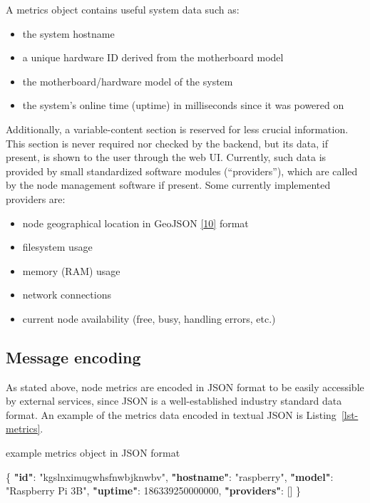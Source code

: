 \documentclass[
  letterpaper,
  a4paper,
  12pt,
  titlepage,
  oneside,
  openany]{book}
\newenvironment{Shaded}{\begin{snugshade}}{\end{snugshade}}
\newcommand{\DataTypeTok}[1]{\textcolor[rgb]{0.00,0.00,0.00}{\textbf{#1}}}
\newcommand{\DecValTok}[1]{\textcolor[rgb]{0.00,0.00,0.00}{#1}}
\newcommand{\FunctionTok}[1]{\textcolor[rgb]{0.00,0.00,0.00}{#1}}
\newcommand{\OtherTok}[1]{\textcolor[rgb]{0.00,0.00,0.00}{#1}}
\newcommand{\StringTok}[1]{\textcolor[rgb]{0.00,0.00,0.00}{#1}}
\providecommand{\tightlist}{%
  \setlength{\itemsep}{0pt}\setlength{\parskip}{0pt}}\usepackage{longtable,booktabs,array}
\renewenvironment{Shaded}{
\begin{changemargin}{1cm}{1cm}
  \begin{snugshade}
}{
  \end{snugshade}
\end{changemargin}
}
\begin{document}
A metrics object contains useful system data such as:

\begin{itemize}
\tightlist
\item
  the system hostname
\item
  a unique hardware ID derived from the motherboard model
\item
  the motherboard/hardware model of the system
\item
  the system's online time (uptime) in milliseconds since it was powered
  on
\end{itemize}

Additionally, a variable-content section is reserved for less crucial
information. This section is never required nor checked by the backend,
but its data, if present, is shown to the user through the web UI.
Currently, such data is provided by small standardized software modules
(\enquote{providers}), which are called by the node management software
if present. Some currently implemented providers are:

\begin{itemize}
\tightlist
\item
  node geographical location in GeoJSON
  \protect\hyperlink{ref-RFC7946}{{[}10{]}} format
\item
  filesystem usage
\item
  memory (RAM) usage
\item
  network connections
\item
  current node availability (free, busy, handling errors, etc.)
\end{itemize}

\hypertarget{message-encoding}{%
\subsection{Message encoding}\label{message-encoding}}

As stated above, node metrics are encoded in JSON format to be easily
accessible by external services, since JSON is a well-established
industry standard data format. An example of the metrics data encoded in
textual JSON is Listing~\ref{lst-metrics}.

\begin{codelisting}

\caption{example metrics object in JSON format}

\hypertarget{lst-metrics}{%
\label{lst-metrics}}%
\begin{Shaded}
\begin{Highlighting}[numbers=left,,]
\FunctionTok{\{}
  \DataTypeTok{"id"}\FunctionTok{:} \StringTok{"kgslnximugwhsfnwbjknwbv"}\FunctionTok{,}
  \DataTypeTok{"hostname"}\FunctionTok{:} \StringTok{"raspberry"}\FunctionTok{,}
  \DataTypeTok{"model"}\FunctionTok{:} \StringTok{"Raspberry Pi 3B"}\FunctionTok{,}
  \DataTypeTok{"uptime"}\FunctionTok{:} \DecValTok{186339250000000}\FunctionTok{,}
  \DataTypeTok{"providers"}\FunctionTok{:} \OtherTok{[]}
\FunctionTok{\}}
\end{Highlighting}
\end{Shaded}

\end{codelisting}
\end{document}
